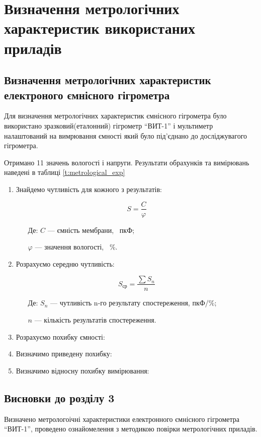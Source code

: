 \chapter{Визначення метрологічних характеристик використаних приладів}
\section{Визначення метрологічних характеристик електроного ємнісного гігрометра}

Для визначення метрологічних характеристик ємнісного гігрометра було використано
зразковий(еталонний) гігрометр ``ВИТ-1'' і мультиметр налаштований на вимрювання ємності який було
під’єднано до досліджувагого гігрометра.

Отримано 11 значень вологості і напруги. Результати обрахунків та вимірювань наведені в таблиці \ref{t:metrological_exp}



\begin{enumerate}[leftmargin=*]
    \item Знайдемо чутливість для кожного з результатів:

    \begin{equation}
        S = \frac{C}{\varphi}
    \end{equation}

    \begin{itemize}
        \item [Де:] $C$ --- ємність мембрани, ~пкФ;
        \item []$\varphi$ ---  значення вологості, ~\%.
    \end{itemize}

    

    \item Розрахуємо середню чутливість:

    \begin{equation}
    S_{\text{ср}} = \frac{\sum S_n}{n}
    \end{equation}

    \begin{itemize}
        \item [Де:] $S_n$ --- чутливість n-го результату спостереження, пкФ/\%;
        \item []$n$ ---  кількість результатів спостереження.
    \end{itemize}

    

    \item Розрахуємо похибку ємності:

    \item Визначимо приведену похибку:

    \item Визначимо відносну похибку вимірювання:
\end{enumerate}

\section*{Висновки до розділу 3}

Визначено метрологоічні характеристики електронного ємнісного гігрометра ``ВИТ-1'', проведено
ознайомелення з методикою повірки метрологічних приладів.
